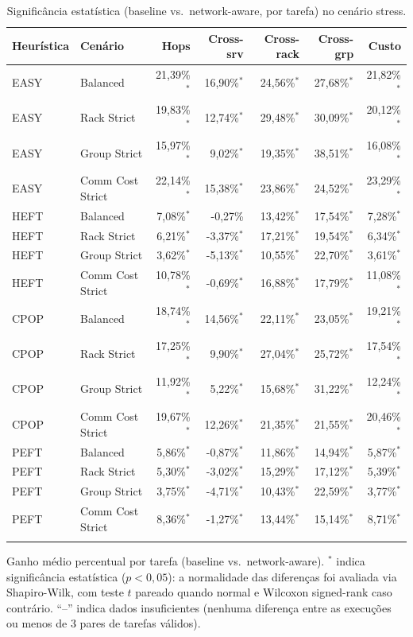 \begin{table}[htbp]
\centering
\small
\caption{Significância estatística (baseline vs.\ network-aware, por tarefa) no cenário stress.}
\label{tab:significancia_stress}
\begin{tabular}{llrrrrr}
\toprule
Heurística & Cenário & Hops & Cross-srv & Cross-rack & Cross-grp & Custo \\
\midrule
EASY & Balanced & 21,39\%$^{*}$ & 16,90\%$^{*}$ & 24,56\%$^{*}$ & 27,68\%$^{*}$ & 21,82\%$^{*}$ \\
EASY & Rack Strict & 19,83\%$^{*}$ & 12,74\%$^{*}$ & 29,48\%$^{*}$ & 30,09\%$^{*}$ & 20,12\%$^{*}$ \\
EASY & Group Strict & 15,97\%$^{*}$ & 9,02\%$^{*}$ & 19,35\%$^{*}$ & 38,51\%$^{*}$ & 16,08\%$^{*}$ \\
EASY & Comm Cost Strict & 22,14\%$^{*}$ & 15,38\%$^{*}$ & 23,86\%$^{*}$ & 24,52\%$^{*}$ & 23,29\%$^{*}$ \\
\addlinespace
HEFT & Balanced & 7,08\%$^{*}$ & -0,27\% & 13,42\%$^{*}$ & 17,54\%$^{*}$ & 7,28\%$^{*}$ \\
HEFT & Rack Strict & 6,21\%$^{*}$ & -3,37\%$^{*}$ & 17,21\%$^{*}$ & 19,54\%$^{*}$ & 6,34\%$^{*}$ \\
HEFT & Group Strict & 3,62\%$^{*}$ & -5,13\%$^{*}$ & 10,55\%$^{*}$ & 22,70\%$^{*}$ & 3,61\%$^{*}$ \\
HEFT & Comm Cost Strict & 10,78\%$^{*}$ & -0,69\%$^{*}$ & 16,88\%$^{*}$ & 17,79\%$^{*}$ & 11,08\%$^{*}$ \\
\addlinespace
CPOP & Balanced & 18,74\%$^{*}$ & 14,56\%$^{*}$ & 22,11\%$^{*}$ & 23,05\%$^{*}$ & 19,21\%$^{*}$ \\
CPOP & Rack Strict & 17,25\%$^{*}$ & 9,90\%$^{*}$ & 27,04\%$^{*}$ & 25,72\%$^{*}$ & 17,54\%$^{*}$ \\
CPOP & Group Strict & 11,92\%$^{*}$ & 5,22\%$^{*}$ & 15,68\%$^{*}$ & 31,22\%$^{*}$ & 12,24\%$^{*}$ \\
CPOP & Comm Cost Strict & 19,67\%$^{*}$ & 12,26\%$^{*}$ & 21,35\%$^{*}$ & 21,55\%$^{*}$ & 20,46\%$^{*}$ \\
\addlinespace
PEFT & Balanced & 5,86\%$^{*}$ & -0,87\%$^{*}$ & 11,86\%$^{*}$ & 14,94\%$^{*}$ & 5,87\%$^{*}$ \\
PEFT & Rack Strict & 5,30\%$^{*}$ & -3,02\%$^{*}$ & 15,29\%$^{*}$ & 17,12\%$^{*}$ & 5,39\%$^{*}$ \\
PEFT & Group Strict & 3,75\%$^{*}$ & -4,71\%$^{*}$ & 10,43\%$^{*}$ & 22,59\%$^{*}$ & 3,77\%$^{*}$ \\
PEFT & Comm Cost Strict & 8,36\%$^{*}$ & -1,27\%$^{*}$ & 13,44\%$^{*}$ & 15,14\%$^{*}$ & 8,71\%$^{*}$ \\
\addlinespace
\bottomrule
\end{tabular}

\vspace{2mm}
\footnotesize Ganho médio percentual por tarefa (baseline vs.\ network-aware). $^{*}$ indica significância estatística ($p<0{,}05$): a normalidade das diferenças foi avaliada via Shapiro-Wilk, com teste $t$ pareado quando normal e Wilcoxon signed-rank caso contrário. ``--'' indica dados insuficientes (nenhuma diferença entre as execuções ou menos de 3 pares de tarefas válidos).
\end{table}

